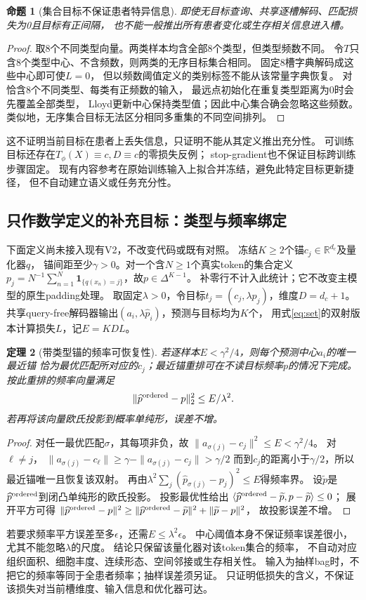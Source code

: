 \documentclass[UTF8,fontset=fandol,11pt,a4paper]{ctexart}
\newtheorem{theorem}{定理}[section]
\newtheorem{proposition}[theorem]{命题}
\theoremstyle{remark}
\newcommand{\R}{\mathbb R}
\newcommand{\ind}{\mathbf 1}
\begin{document}
\begin{proposition}[集合目标不保证患者特异信息]\label{pr:support}
即使无目标查询、共享逐槽解码、匹配损失为0且目标有正间隔，
也不能一般推出所有患者变化或生存相关信息进入槽。
\end{proposition}
\begin{proof}
取8个不同类型向量。两类样本均含全部8个类型，但类型频数不同。
令$T$只含8个类型中心、不含频数，则两类的无序目标集合相同。
固定8槽字典解码成这些中心即可使$L=0$，
但以频数阈值定义的类别标签不能从该常量字典恢复。
对恰含8个不同类型、每类有正频数的输入，
最远点初始化在重复类型距离为0时会先覆盖全部类型，
Lloyd更新中心保持类型值；因此中心集合确会忽略这些频数。
类似地，无序集合目标无法区分相同多重集的不同空间排列。
\end{proof}
这不证明当前目标在患者上丢失信息，只证明不能从其定义推出充分性。
可训练目标还存在$T_\phi(X)\equiv c,D\equiv c$的零损失反例；
stop-gradient也不保证目标跨训练步骤固定。
现有内容参考在原始训练输入上拟合并冻结，避免此特定目标更新捷径，
但不自动建立语义或任务充分性。

\subsection{只作数学定义的补充目标：类型与频率绑定}
下面定义尚未接入现有V2，不改变代码或既有对照。
冻结$K\ge2$个锚$c_j\in\R^{d_c}$及量化器$q$，
锚间距至少$\gamma>0$。对一个含$N\ge1$个真实token的集合定义
$p_j=N^{-1}\sum_{n=1}^N\ind_{\{q(x_n)=j\}}$，故$p\in\Delta^{K-1}$。
补零行不计入此统计；它不改变主模型的原生padding处理。
取固定$\lambda>0$，令目标$t_j=(c_j,\lambda p_j)$，维度$D=d_c+1$。
共享query-free解码器输出$(a_i,\lambda\widehat p_i)$，预测与目标均为$K$个，
用式\eqref{eq:set}的双射版本计算损失$L$，记$E=KDL$。

\begin{theorem}[带类型锚的频率可恢复性]
若逐样本$E<\gamma^2/4$，则每个预测中心$a_i$的唯一最近锚
恰为最优匹配所对应的$c_j$；最近锚重排可在不读目标频率$p$的情况下完成。
按此重排的频率向量满足
\[
 \|\widehat p^{\rm ordered}-p\|_2^2\le E/\lambda^2.
\]
若再将该向量欧氏投影到概率单纯形，误差不增。
\end{theorem}
\begin{proof}
对任一最优匹配$\sigma$，其每项非负，故
$\|a_{\sigma(j)}-c_j\|^2\le E<\gamma^2/4$。
对$\ell\ne j$，
$\|a_{\sigma(j)}-c_\ell\|\ge\gamma-\|a_{\sigma(j)}-c_j\|>\gamma/2$
而到$c_j$的距离小于$\gamma/2$，所以最近锚唯一且恢复该双射。
再由$\lambda^2\sum_j(\widehat p_{\sigma(j)}-p_j)^2\le E$得频率界。
设$\widetilde p$是$\widehat p^{\rm ordered}$到闭凸单纯形的欧氏投影。
投影最优性给出
$\langle\widehat p^{\rm ordered}-\widetilde p,p-\widetilde p\rangle\le0$；
展开平方可得
$\|\widehat p^{\rm ordered}-p\|^2
\ge\|\widehat p^{\rm ordered}-\widetilde p\|^2+\|\widetilde p-p\|^2$，
故投影误差不增。
\end{proof}
若要求频率平方误差至多$\epsilon$，还需$E\le\lambda^2\epsilon$。
中心阈值本身不保证频率误差很小，尤其不能忽略$\lambda$的尺度。
结论只保留该量化器对该token集合的频率，
不自动对应组织面积、细胞丰度、连续形态、空间邻接或生存相关性。
输入为抽样bag时，不把它的频率等同于全患者频率；抽样误差须另证。
只证明低损失的含义，不保证该损失对当前槽维度、输入信息和优化器可达。
\end{document}
